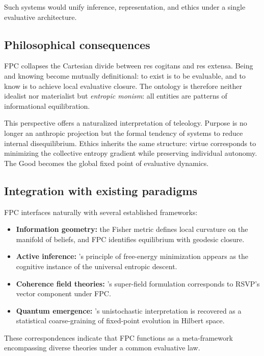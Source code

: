 \documentclass[12pt,a4paper]{article}
\theoremstyle{plain}
\begin{document}
Such systems would unify inference, representation, and ethics under a single evaluative architecture.

\subsection{Philosophical consequences}
FPC collapses the Cartesian divide between res cogitans and res extensa.  
Being and knowing become mutually definitional: to exist is to be evaluable, and to know is to achieve local evaluative closure.  
The ontology is therefore neither idealist nor materialist but \emph{entropic monism}: all entities are patterns of informational equilibration.  

This perspective offers a naturalized interpretation of teleology.
Purpose is no longer an anthropic projection but the formal tendency of systems to reduce internal disequilibrium.
Ethics inherits the same structure: virtue corresponds to minimizing the collective entropy gradient while preserving individual autonomy.
The Good becomes the global fixed point of evaluative dynamics.

\subsection{Integration with existing paradigms}
FPC interfaces naturally with several established frameworks:

\begin{itemize}[nosep]
  \item \textbf{Information geometry:} the Fisher metric defines local curvature on the manifold of beliefs, and FPC identifies equilibrium with geodesic closure.
  \item \textbf{Active inference:} \citeauthor{friston2025beautiful}’s principle of free-energy minimization appears as the cognitive instance of the universal entropic descent.
  \item \textbf{Coherence field theories:} \citeauthor{logan2025coherence}’s super-field formulation corresponds to RSVP’s vector component under FPC.
  \item \textbf{Quantum emergence:} \citeauthor{barandes2025unistochastic}’s unistochastic interpretation is recovered as a statistical coarse-graining of fixed-point evolution in Hilbert space.
\end{itemize}

These correspondences indicate that FPC functions as a meta-framework encompassing diverse theories under a common evaluative law.
\end{document}
